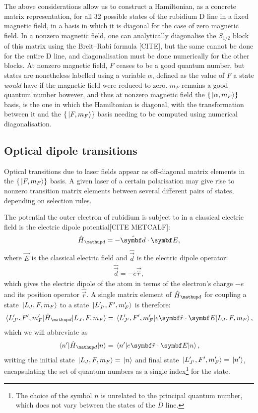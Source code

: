 The above considerations allow us to construct a Hamiltonian, as a concrete matrix representation, for all 32 possible states of the rubidium D line in a fixed magnetic field, in a basis in which it is diagonal for the case of zero magnetic field. In a nonzero magnetic field, one can analytically diagonalise the $S_{1/2}$ block of this matrix using the Breit--Rabi formula [CITE], but the same cannot be done for the entire D line, and diagonalisation must be done numerically for the other blocks. At nonzero magnetic field, $F$ ceases to be a good quantum number, but states are nonetheless labelled using a variable $\alpha$, defined as the value of $F$ a state \emph{would} have if the magnetic field were reduced to zero. $m_F$ remains a good quantum number however, and thus at nonzero magnetic field the $\{\ket{\alpha, m_F}\}$ basis, is the one in which the Hamiltonian is diagonal, with the transformation between it and the $\{\ket{F, m_F}\}$ basis needing to be computed using numerical diagonalisation.

\subsection{Optical dipole transitions}

Optical transitions due to laser fields appear as off-diagonal matrix elements in the $\{\ket{F, m_F}\}$ basis. A given laser of a certain polarisation may give rise to nonzero transition matrix elements between several different pairs of states, depending on selection rules.

The potential the outer electron of rubidium is subject to in a classical electric field is the electric dipole potential[CITE METCALF]:
\begin{align}
\hat H_\up{d} = -\hat{\vec d}\cdot\vec E,
\end{align}
where $\vec E$ is the classical electric field and $\hat{\vec d}$ is the electric dipole operator:
\begin{align}
\hat{\vec d} = -e\vec{\hat r},
\end{align}
which gives the electric dipole of the atom in terms of the electron's charge $-e$ and its position operator $\hat{\vec r}$. A single matrix element of $\hat H_\up{d}$ for coupling a state $\ket{L_J, F, m_F}$ to a state $\ket{L^\prime_{J^\prime}, F^\prime, m_F^\prime}$ is therefore:
\begin{align}\label{eq:electric_dipole_potential}
\matrixel{L^\prime_{J^\prime}, F^\prime, m_F^\prime}{\hat H_\up{d}}{L_J, F, m_F} = 
\matrixel{L^\prime_{J^\prime}, F^\prime, m_F^\prime}{e\vec{\hat r}\cdot\vec E}{L_J, F, m_F},
\end{align}
which we will abbreviate as
\begin{align}
\matrixel{n^\prime}{\hat H_\up{d}}{n} = 
\matrixel{n^\prime}{e\vec{\hat r}\cdot\vec E}{n},
\end{align}
writing the initial state $\ket{L_J, F, m_F}=\ket{n}$ and final state $\ket{L^\prime_{J^\prime}, F^\prime, m_F^\prime}=\ket{n^\prime}$, encapsulating the set of quantum numbers as a single index\footnote{The choice of the symbol $n$ is unrelated to the principal quantum number, which does not vary between the states of the $D$ line.} for the state.

